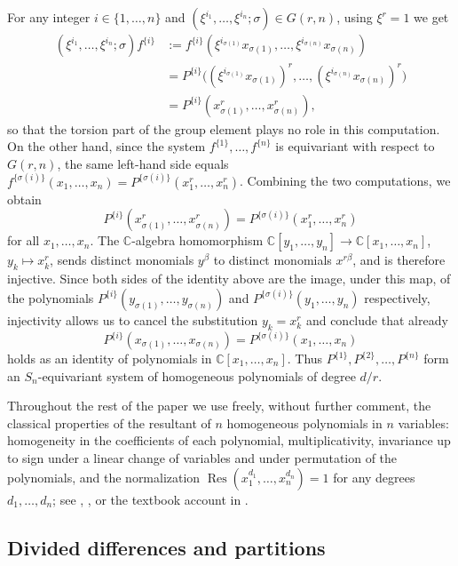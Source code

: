 \documentclass[12pt]{amsart}
\theoremstyle{definition}
\newcommand{\Res}{\operatorname{Res}}
\begin{document}
For any integer $i \in \{1,\dots,n\}$ and $(\xi^{i_1},\dots,\xi^{i_n};\sigma) \in G(r,n)$, using $\xi^r = 1$ we get
\begin{align*}
(\xi^{i_1},\dots,\xi^{i_n};\sigma)f^{\{i\}} &:= f^{\{i\}}(\xi^{i_{\sigma(1)}}x_{\sigma(1)},\dots,\xi^{i_{\sigma(n)}}x_{\sigma(n)}) \\
&= P^{\{i\}}\big((\xi^{i_{\sigma(1)}}x_{\sigma(1)})^r,\dots,(\xi^{i_{\sigma(n)}}x_{\sigma(n)})^r\big) \\
&= P^{\{i\}}(x_{\sigma(1)}^r,\dots,x_{\sigma(n)}^r),
\end{align*}
so that the torsion part of the group element plays no role in this computation. On the other hand, since the system $f^{\{1\}},\dots,f^{\{n\}}$ is equivariant with respect to $G(r,n)$, the same left-hand side equals $f^{\{\sigma(i)\}}(x_1,\dots,x_n) = P^{\{\sigma(i)\}}(x_1^r,\dots,x_n^r)$. Combining the two computations, we obtain
\[
P^{\{i\}}(x_{\sigma(1)}^r,\dots,x_{\sigma(n)}^r) = P^{\{\sigma(i)\}}(x_1^r,\dots,x_n^r)
\]
for all $x_1,\dots,x_n$. The $\mathbb{C}$-algebra homomorphism $\mathbb{C}[y_1,\dots,y_n] \to \mathbb{C}[x_1,\dots,x_n]$, $y_k \mapsto x_k^r$, sends distinct monomials $y^\beta$ to distinct monomials $x^{r\beta}$, and is therefore injective. Since both sides of the identity above are the image, under this map, of the polynomials $P^{\{i\}}(y_{\sigma(1)},\dots,y_{\sigma(n)})$ and $P^{\{\sigma(i)\}}(y_1,\dots,y_n)$ respectively, injectivity allows us to cancel the substitution $y_k = x_k^r$ and conclude that already
\[
P^{\{i\}}(x_{\sigma(1)},\dots,x_{\sigma(n)}) = P^{\{\sigma(i)\}}(x_1,\dots,x_n)
\]
holds as an identity of polynomials in $\mathbb{C}[x_1,\dots,x_n]$. Thus $P^{\{1\}}, P^{\{2\}},\dots,P^{\{n\}}$ form an $S_n$-equivariant system of homogeneous polynomials of degree $d/r$.

Throughout the rest of the paper we use freely, without further comment, the classical properties of the resultant of $n$ homogeneous polynomials in $n$ variables: homogeneity in the coefficients of each polynomial, multiplicativity, invariance up to sign under a linear change of variables and under permutation of the polynomials, and the normalization $\Res(x_1^{d_1},\dots,x_n^{d_n}) = 1$ for any degrees $d_1,\dots,d_n$; see \citep[\S 5]{Jouanolou1991}, \citep{Jouanolou1997}, or the textbook account in \citep[Chapter 3]{CoxLittleOShea2005}.

\subsection{Divided differences and partitions}
\end{document}
